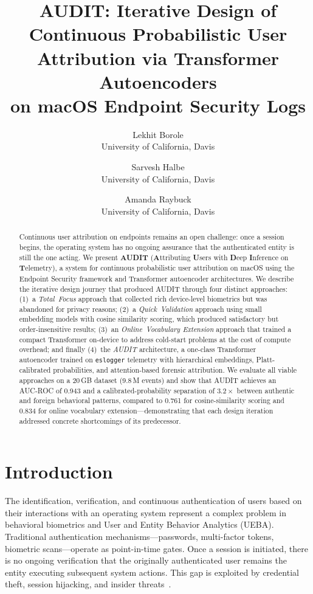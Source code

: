 \documentclass[letterpaper,twocolumn,10pt]{article}
\title{\Large \bf AUDIT: Iterative Design of Continuous Probabilistic
User Attribution via Transformer Autoencoders\\on macOS Endpoint
Security Logs}
\author{
{\rm Lekhit Borole}\\
University of California, Davis
\and
{\rm Sarvesh Halbe}\\
University of California, Davis
\and
{\rm Amanda Raybuck}\\
University of California, Davis
}
\date{}
\begin{document}
\maketitle
\thispagestyle{empty}


\begin{abstract}
Continuous user attribution on endpoints remains an open challenge:
once a session begins, the operating system has no ongoing assurance
that the authenticated entity is still the one acting.  We present
\textbf{AUDIT} (\textbf{A}ttributing \textbf{U}sers with
\textbf{D}eep \textbf{I}nference on \textbf{T}elemetry), a system
for continuous probabilistic user attribution on macOS using the
Endpoint Security framework and Transformer autoencoder
architectures.  We describe the iterative design journey that
produced AUDIT through four distinct approaches: (1)~a
\emph{Total~Focus} approach that collected rich device-level
biometrics but was abandoned for privacy reasons; (2)~a
\emph{Quick~Validation} approach using small embedding models with
cosine similarity scoring, which produced satisfactory but
order-insensitive results; (3)~an \emph{Online~Vocabulary
Extension} approach that trained a compact Transformer on-device to
address cold-start problems at the cost of compute overhead; and
finally (4)~the \emph{AUDIT} architecture, a one-class Transformer
autoencoder trained on \texttt{eslogger} telemetry with
hierarchical embeddings, Platt-calibrated probabilities, and
attention-based forensic attribution.  We evaluate all viable
approaches on a 20\,GB dataset (9.8\,M events) and show that AUDIT
achieves an AUC-ROC of 0.943 and a calibrated-probability
separation of $3.2\times$ between authentic and foreign behavioral
patterns, compared to 0.761 for cosine-similarity scoring and
0.834 for online vocabulary extension---demonstrating that each
design iteration addressed concrete shortcomings of its
predecessor.
\end{abstract}


\section{Introduction}
\label{sec:intro}

The identification, verification, and continuous authentication of
users based on their interactions with an operating system represent
a complex problem in behavioral biometrics and User and Entity
Behavior Analytics (UEBA).  Traditional authentication
mechanisms---passwords, multi-factor tokens, biometric
scans---operate as point-in-time gates.  Once a session is
initiated, there is no ongoing verification that the originally
authenticated user remains the entity executing subsequent system
actions.  This gap is exploited by credential theft, session
hijacking, and insider threats~\cite{deeplog,loginspect}.
\end{document}
